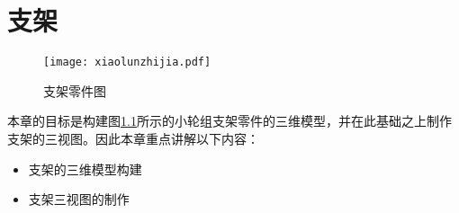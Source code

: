 \chapter{支架}
\begin{figure}[htbp]
\centering
\texttt{[image: xiaolunzhijia.pdf]}
\caption{支架零件图}\label{fig:xiaolunzhijia}
\end{figure}

本章的目标是构建图\ref{fig:xiaolunzhijia}所示的小轮组支架零件的三维模型，并在此基础之上制作支架的三视图。因此本章重点讲解以下内容：
\begin{itemize}
\item 支架的三维模型构建
\item 支架三视图的制作
\end{itemize}


\endinput